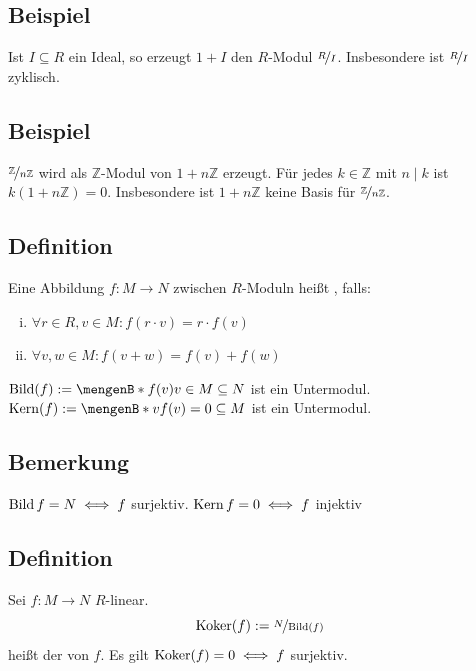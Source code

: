 \subsection{Beispiel} %
\label{sub:147}
Ist $I \subseteq R$ ein Ideal, so erzeugt $1+ I$ den $R$-Modul $\nicefrac{R}{I}$. Insbesondere ist $\nicefrac{R}{I}$ zyklisch.

\subsection{Beispiel} %
\label{sub:148}
$\nicefrac{\mathds{Z}}{n \mathds{Z}}$ wird als $\mathds{Z}$-Modul von $1+ n \mathds{Z}$ erzeugt. Für jedes $k \in \mathds{Z}$ mit $n \mid k$ ist $k(1+n \mathds{Z})=0$.
Insbesondere ist $1+ n \mathds{Z}$ keine {\glqq Basis\grqq} für $\nicefrac{\mathds{Z}}{n \mathds{Z}}$.

\subsection[Definition: $R$-linear]{Definition} %
\label{sub:149}
Eine Abbildung $f : M  \to N$ zwischen $R$-Moduln heißt , falls:
\begin{enumerate}[(i)]
	\item $\forall r \in R, v \in M : f(r \cdot v) = r \cdot f(v) $
	\item $\forall v,w \in M : f(v+w) = f(v) + f(w)$
\end{enumerate}
$\bild (f) := \set[f(v)]{v \in M} \subseteq N $ ist ein Untermodul. \\
$\Kern (f) := \set[v]{f(v) =0} \subseteq M $ ist ein Untermodul.

\subsection{Bemerkung} %
\label{sub:1410}
$\bild f = N \iff f$ surjektiv. $\Kern f = 0 \iff f$ injektiv

\subsection[Definition: Kokern]{Definition} %
\label{sub:1411}
Sei $f : M \to N$ $R$-linear. 
\[
	\koker (f) := \nicefrac{N}{\bild (f)}
\]
heißt der  von $f$. Es gilt $\koker (f) = 0 \iff f$ surjektiv.

